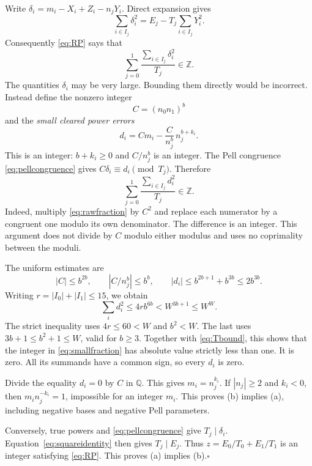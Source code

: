 \documentclass[11pt,letterpaper]{article}
\theoremstyle{definition}\newtheorem{definition}[theorem]{Definition}
\theoremstyle{remark}\newtheorem{remark}[theorem]{Remark}
\newcommand{\Z}{\mathbb Z}\newcommand{\N}{\mathbb N}
\begin{document}
Write $\delta_i=m_i-X_i+Z_i-n_jY_i$. Direct expansion gives
\begin{equation}\label{eq:squareidentity}
 \sum_{i\in I_j}\delta_i^2=E_j-T_j\sum_{i\in I_j}Y_i^2.
\end{equation}
Consequently \eqref{eq:RP} says that
\begin{equation}\label{eq:rawfraction}
 \sum_{j=0}^1\frac{\sum_{i\in I_j}\delta_i^2}{T_j}\in\Z.
\end{equation}
The quantities $\delta_i$ may be very large. Bounding them directly would
be incorrect. Instead define the nonzero integer
\[
 C=(n_0n_1)^b
\]
and the \emph{small cleared power errors}
\begin{equation}\label{eq:smallerror}
 d_i=Cm_i-\frac{C}{n_j^b}\,n_j^{b+k_i}.
\end{equation}
This is an integer: $b+k_i\ge0$ and $C/n_j^b$ is an integer. The Pell
congruence \eqref{eq:pellcongruence} gives
$C\delta_i\equiv d_i\pmod {T_j}$. Therefore
\begin{equation}\label{eq:smallfraction}
 \sum_{j=0}^1\frac{\sum_{i\in I_j}d_i^2}{T_j}\in\Z.
\end{equation}
Indeed, multiply \eqref{eq:rawfraction} by $C^2$ and replace each
numerator by a congruent one modulo its own denominator. The difference
is an integer. This argument does not divide by $C$ modulo either
modulus and uses no coprimality between the moduli.

The uniform estimates are
\[
 |C|\le b^{2b},\qquad |C/n_j^b|\le b^b,\qquad
 |d_i|\le b^{2b+1}+b^{3b}\le2b^{3b}.
\]
Writing $r=|I_0|+|I_1|\le15$, we obtain
\begin{equation}\label{eq:budget}
 \sum_i d_i^2\le4r b^{6b}<W^{3b+1}\le W^W.
\end{equation}
The strict inequality uses $4r\le60<W$ and $b^2<W$. The last uses
$3b+1\le b^2+1\le W$, valid for $b\ge3$.
Together with \eqref{eq:Tbound}, this shows that the integer in
\eqref{eq:smallfraction} has absolute value strictly less than one.
It is zero. All its summands have a common sign, so every $d_i$ is zero.

Divide the equality $d_i=0$ by $C$ in $\mathbb Q$. This gives
$m_i=n_j^{k_i}$. If $|n_j|\ge2$ and $k_i<0$, then
$m_i n_j^{-k_i}=1$, impossible for an integer $m_i$. This proves (b)
implies (a), including negative bases and negative Pell parameters.

Conversely, true powers and \eqref{eq:pellcongruence} give
$T_j\mid\delta_i$. Equation~\eqref{eq:squareidentity} then gives
$T_j\mid E_j$. Thus $z=E_0/T_0+E_1/T_1$ is an integer satisfying
\eqref{eq:RP}. This proves (a) implies (b).\hfill$\square$
\end{document}
